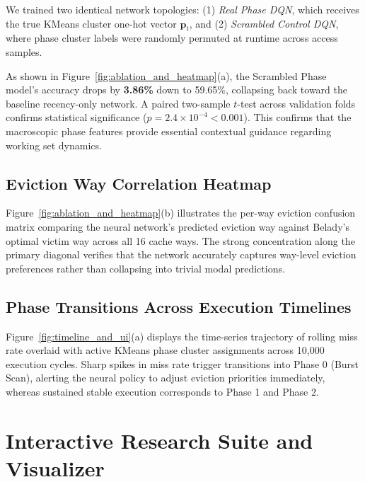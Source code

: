 \documentclass[conference]{IEEEtran}
\begin{document}
We trained two identical network topologies: (1) \textit{Real Phase DQN}, which receives the true KMeans cluster one-hot vector $\mathbf{p}_t$, and (2) \textit{Scrambled Control DQN}, where phase cluster labels were randomly permuted at runtime across access samples.

As shown in Figure~\ref{fig:ablation_and_heatmap}(a), the Scrambled Phase model's accuracy drops by \textbf{3.86\%} down to 59.65\%, collapsing back toward the baseline recency-only network. A paired two-sample $t$-test across validation folds confirms statistical significance ($p = 2.4 \times 10^{-4} < 0.001$). This confirms that the macroscopic phase features provide essential contextual guidance regarding working set dynamics.

\subsection{Eviction Way Correlation Heatmap}
Figure~\ref{fig:ablation_and_heatmap}(b) illustrates the per-way eviction confusion matrix comparing the neural network's predicted eviction way against Belady's optimal victim way across all 16 cache ways. The strong concentration along the primary diagonal verifies that the network accurately captures way-level eviction preferences rather than collapsing into trivial modal predictions.

\subsection{Phase Transitions Across Execution Timelines}
Figure~\ref{fig:timeline_and_ui}(a) displays the time-series trajectory of rolling miss rate overlaid with active KMeans phase cluster assignments across 10,000 execution cycles. Sharp spikes in miss rate trigger transitions into Phase 0 (Burst Scan), alerting the neural policy to adjust eviction priorities immediately, whereas sustained stable execution corresponds to Phase 1 and Phase 2.

\section{Interactive Research Suite and Visualizer}
\end{document}
